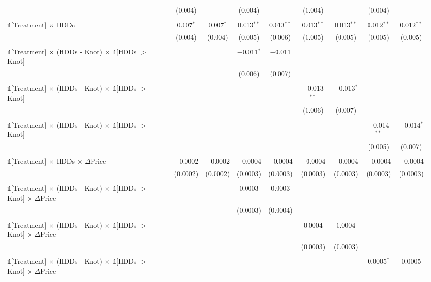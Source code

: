 \begin{table}[!htbp]
\begin{longtable}{@{\extracolsep{0pt}}lcccccccc}
  & (0.004) &  & (0.004) &  & (0.004) &  & (0.004) &  \\ 
  & & & & & & & & \\ 
 $\mathbb{1}$[Treatment] $\times$ HDDs & 0.007$^{*}$ & 0.007$^{*}$ & 0.013$^{**}$ & 0.013$^{**}$ & 0.013$^{**}$ & 0.013$^{**}$ & 0.012$^{**}$ & 0.012$^{**}$ \\ 
  & (0.004) & (0.004) & (0.005) & (0.006) & (0.005) & (0.005) & (0.005) & (0.005) \\ 
  & & & & & & & & \\ 
 $\mathbb{1}$[Treatment] $\times$ (HDDs - Knot) $\times$ $\mathbb{1}$[HDDs $>$ Knot] &  &  & $-$0.011$^{*}$ & $-$0.011 &  &  &  &  \\ 
  &  &  & (0.006) & (0.007) &  &  &  &  \\ 
  & & & & & & & & \\ 
 $\mathbb{1}$[Treatment] $\times$ (HDDs - Knot) $\times$ $\mathbb{1}$[HDDs $>$ Knot] &  &  &  &  & $-$0.013$^{**}$ & $-$0.013$^{*}$ &  &  \\ 
  &  &  &  &  & (0.006) & (0.007) &  &  \\ 
  & & & & & & & & \\ 
 $\mathbb{1}$[Treatment] $\times$ (HDDs - Knot) $\times$ $\mathbb{1}$[HDDs $>$ Knot] &  &  &  &  &  &  & $-$0.014$^{**}$ & $-$0.014$^{*}$ \\ 
  &  &  &  &  &  &  & (0.005) & (0.007) \\ 
  & & & & & & & & \\ 
 $\mathbb{1}$[Treatment] $\times$ HDDs $\times$ $\Delta$Price & $-$0.0002 & $-$0.0002 & $-$0.0004 & $-$0.0004 & $-$0.0004 & $-$0.0004 & $-$0.0004 & $-$0.0004 \\ 
  & (0.0002) & (0.0002) & (0.0003) & (0.0003) & (0.0003) & (0.0003) & (0.0003) & (0.0003) \\ 
  & & & & & & & & \\ 
 $\mathbb{1}$[Treatment] $\times$ (HDDs - Knot) $\times$ $\mathbb{1}$[HDDs $>$ Knot] $\times$ $\Delta$Price &  &  & 0.0003 & 0.0003 &  &  &  &  \\ 
  &  &  & (0.0003) & (0.0004) &  &  &  &  \\ 
  & & & & & & & & \\ 
 $\mathbb{1}$[Treatment] $\times$ (HDDs - Knot) $\times$ $\mathbb{1}$[HDDs $>$ Knot] $\times$ $\Delta$Price &  &  &  &  & 0.0004 & 0.0004 &  &  \\ 
  &  &  &  &  & (0.0003) & (0.0003) &  &  \\ 
  & & & & & & & & \\ 
 $\mathbb{1}$[Treatment] $\times$ (HDDs - Knot) $\times$ $\mathbb{1}$[HDDs $>$ Knot] $\times$ $\Delta$Price &  &  &  &  &  &  & 0.0005$^{*}$ & 0.0005 \\ 

\end{longtable}
\end{table}
